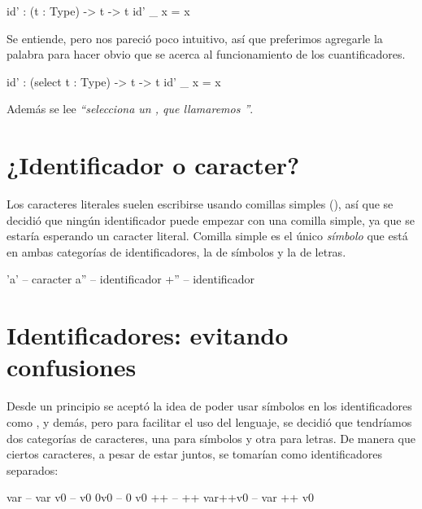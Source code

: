 {\begin{designfr}
\begin{anglercode}
id' : (t : Type) -> t -> t
id' _ x = x
\end{anglercode}

Se entiende, pero nos pareció poco intuitivo, así que preferimos agregarle la palabra  para hacer obvio que se acerca al funcionamiento de los cuantificadores.

\begin{anglercode}
id' : (select t : Type) -> t -> t
id' _ x = x
\end{anglercode}

Además se lee \emph{\enquote{selecciona un , que llamaremos }}.
\end{designfr}

\section{¿Identificador o caracter?}

\begin{designfr}
Los caracteres literales suelen escribirse usando comillas simples (), así que se decidió que ningún identificador puede empezar con una comilla simple, ya que se estaría esperando un caracter literal. Comilla simple es el único \emph{símbolo} que está en ambas categorías de identificadores, la de símbolos y la de letras.

\begin{anglercode}
'a'     -- caracter
a''     -- identificador
+''     -- identificador
\end{anglercode}
\end{designfr}


\section{Identificadores: evitando confusiones}

\begin{designfr}
Desde un principio se aceptó la idea de poder usar símbolos en los identificadores como \inlinecode{+}, \inlinecode{*} y demás, pero para facilitar el uso del lenguaje, se decidió que tendríamos dos categorías de caracteres, una para símbolos y otra para letras. De manera que ciertos caracteres, a pesar de estar juntos, se tomarían como identificadores separados:

\begin{anglercode}
var         -- var
v0          -- v0
0v0         -- 0 v0
++          -- ++
var++v0     -- var ++ v0
\end{anglercode}
\end{designfr}

}
